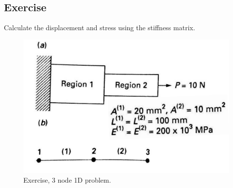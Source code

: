 \documentclass[class=report, crop=false, 12pt,a4paper]{standalone}
\begin{document}
\subsection{Exercise}
Calculate the displacement and stress using the stiffness matrix.
\begin{figure}[H]
	\centering
	\includegraphics[width = \textwidth]{../img/figure4.png}
	\caption{Exercise, 3 node 1D problem.}
\end{figure}
\end{document}
